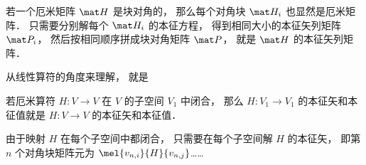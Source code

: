 

\begin{theorem}{}
若一个厄米矩阵 $\mat H$ 是块对角的， 那么每个对角块 $\mat H_i$ 也显然是厄米矩阵． 只需要分别解每个 $\mat H_i$ 的本征方程， 得到相同大小的本征矢列矩阵 $\mat P_i$， 然后按相同顺序拼成块对角矩阵 $\mat P$， 就是 $\mat H$ 的本征矢列矩阵．
\end{theorem}

从线性算符的角度来理解， 就是
\begin{theorem}{}
若厄米算符 $H:V\to V$ 在 $V$ 的子空间 $V_1$ 中闭合， 那么 $H:V_1\to V_1$ 的本征矢和本征值就是 $H:V\to V$ 的本征矢和本征值．
\end{theorem}


由于映射 $H$ 在每个子空间中都闭合， 只需要在每个子空间解 $H$ 的本征矢， 即第 $n$ 个对角块矩阵元为 $\mel{v_{n,i}}{H}{v_{n,j}}$……
